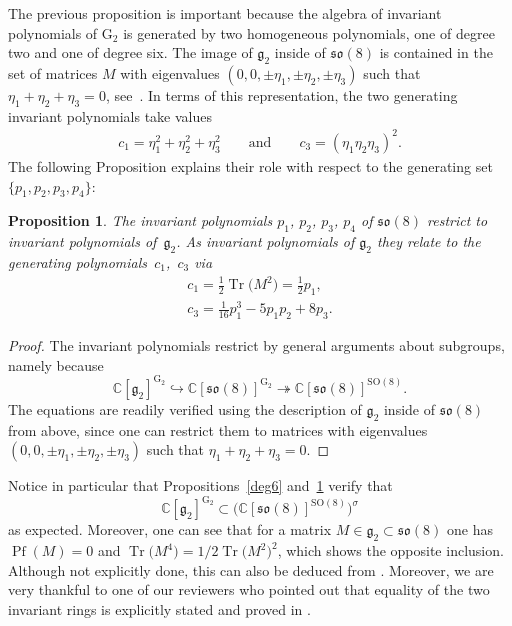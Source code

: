 \documentclass[10pt,a4paper]{amsart}
\numberwithin{equation}{section}
\def\C{{\mathbb C}}
\newcommand{\Pf}{\operatorname{Pf}}
\newcommand{\SO}{{\mathrm{SO}}}
\newcommand{\Tr}{\operatorname{Tr}}
\newtheorem{Proposition}[Theorem]{Proposition}
 { \theoremstyle{definition}
\newtheorem{Definition}[Theorem]{Definition}
\newtheorem{Remark}[Theorem]{Remark} }
\begin{document}
The previous proposition is important because the algebra of invariant polynomials of $\mathrm{G}_2$ is generated by two homogeneous polynomials, one of degree two and one of degree six. The image of $\mathfrak{g}_2$ inside of $\mathfrak{so}(8)$ is contained in the set of matrices $M$ with eigenvalues $(0,0,\pm \eta_1, \pm \eta_2, \pm \eta_3)$ such that $\eta_1 + \eta_2 + \eta_3 = 0$, see~\cite{N3}. In terms of this representation, the two generating invariant polynomials take values
 \begin{eqnarray} c_1=\eta_1^2+\eta_2^2+\eta_3^2\qquad \text{and} \qquad c_3=(\eta_1 \eta_2 \eta_3)^2. \label{13}
 \end{eqnarray}
The following Proposition explains their role with respect to the generating set $\{p_1, p_2, p_3, p_4 \}$:

\begin{Proposition}\label{image}
The invariant polynomials $p_1$, $p_2$, $p_3$, $p_4$ of $\mathfrak{so}(8)$ restrict to invariant polynomials of~$\mathfrak{g}_2$. As invariant polynomials of $\mathfrak{g}_2$ they relate to the generating polynomials~$c_1$,~$c_3$ via
\begin{gather*}
 c_1 = \frac{1}{2} \Tr\big(M^2\big) = \frac{1}{2} p_1 , \\
 c_3 = \frac{1}{16}p_1^3 - 5 p_1 p_2 + 8 p_3.
\end{gather*}
\end{Proposition}
\begin{proof} The invariant polynomials restrict by general arguments about subgroups, namely because
\begin{equation}\label{inj}\C [\mathfrak{g}_2]^{\mathrm{G}_2} \hookrightarrow \C [\mathfrak{so}(8)]^{\mathrm{G}_2} \twoheadrightarrow \C [\mathfrak{so}(8)]^{\SO(8)}.\end{equation}
The equations are readily verified using the description of $\mathfrak{g}_2$ inside of $\mathfrak{so}(8)$ from above, since one can restrict them to matrices with eigenvalues $(0,0,\pm \eta_1, \pm \eta_2, \pm \eta_3)$ such that $\eta_1 + \eta_2 + \eta_3 = 0$.
\end{proof}

\begin{Remark}
Notice in particular that Propositions~\ref{deg6} and~\ref{image} verify that
\[
\C [\mathfrak{g}_2]^{\mathrm{G}_2} \subset \big(\C [\mathfrak{so}(8)]^{\SO (8)}\big)^\sigma
\] as expected. Moreover, one can see that for a matrix $M \in \mathfrak{g}_2 \subset \mathfrak{so}(8)$ one has $\Pf (M) = 0$ and $\Tr \big(M^4\big) = 1/2 \Tr \big(M^2\big)^2$, which shows the opposite inclusion. Although not explicitly done, this can also be deduced from \cite[Section~8.8, p.~144]{slod}. Moreover, we are very thankful to one of our reviewers who pointed out that
equality of the two invariant rings is explicitly stated and proved in \cite[Corollary~2.2.3(ii)]{review1}.
\end{Remark}
\end{document}
